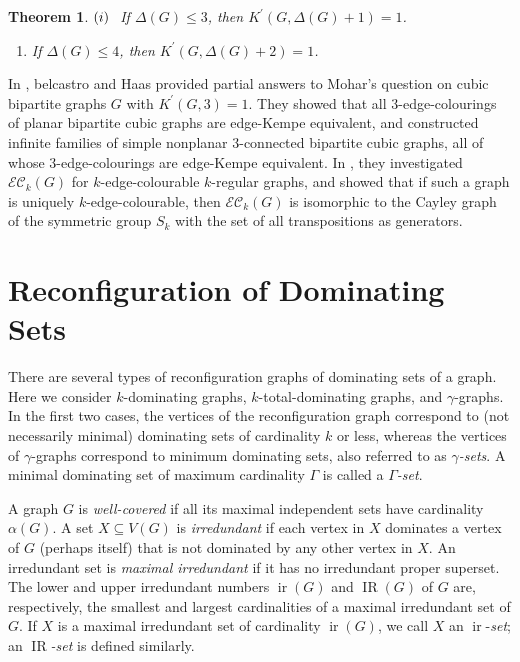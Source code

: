 \documentclass[12pt]{article}%
\newtheorem{theorem}{Theorem}[section]
\begin{document}
\begin{theorem}
\emph{\cite{26CM-MMS}}\hspace{0.1in}$(i)\hspace{0.1in}$If $\Delta(G)\leq3$,
then $K^{\prime}(G,\Delta(G)+1)=1$.

\begin{enumerate}
\item[$(ii)$] If $\Delta(G)\leq4$, then $K^{\prime}(G,\Delta(G)+2)=1$.
\end{enumerate}
\end{theorem}

In \cite{26CM-belcasHaas2014}, belcastro and Haas provided partial answers to
Mohar's question on cubic bipartite graphs $G$ with $K^{\prime}(G,3)=1$. They
showed that all $3$-edge-colourings of planar bipartite cubic graphs are
edge-Kempe equivalent, and constructed infinite families of simple nonplanar
$3$-connected bipartite cubic graphs, all of whose $3$-edge-colourings are
edge-Kempe equivalent. In \cite{26CM-belcasHaas2017}, they investigated
$\mathcal{EC}_{k}(G)$ for $k$-edge-colourable $k$-regular graphs, and showed
that if such a graph is uniquely $k$-edge-colourable, then $\mathcal{EC}%
_{k}(G)$ is isomorphic to the Cayley graph of the symmetric group $S_{k}$ with
the set of all transpositions as generators.

\section{Reconfiguration of Dominating Sets}

\label{SecDom} There are several types of reconfiguration graphs of dominating
sets of a graph. Here we consider $k$-dominating graphs, $k$-total-dominating
graphs, and $\gamma$-graphs. In the first two cases, the vertices of the
reconfiguration graph correspond to (not necessarily minimal) dominating sets
of cardinality $k$ or less, whereas the vertices of $\gamma$-graphs correspond
to minimum dominating sets, also referred to as $\gamma$\emph{-sets}. A
minimal dominating set of maximum cardinality $\Gamma$ is called a $\Gamma
$\emph{-set}.

A graph $G$ is \emph{well-covered} if all its maximal independent sets have
cardinality $\alpha(G)$. A set $X\subseteq V(G)$ is \emph{irredundant} if each
vertex in $X$ dominates a vertex of $G$ (perhaps itself) that is not dominated
by any other vertex in $X$. An irredundant set is \emph{maximal irredundant}
if it has no irredundant proper superset. The lower and upper irredundant
numbers $\operatorname{ir}(G)$ and $\operatorname{IR}(G)$ of $G$ are,
respectively, the smallest and largest cardinalities of a maximal irredundant
set of $G$. If $X$ is a maximal irredundant set of cardinality
$\operatorname{ir}(G)$, we call $X$ an $\operatorname{ir}$-\emph{set}; an
$\operatorname{IR}$\emph{-set} is defined similarly.
\end{document}
